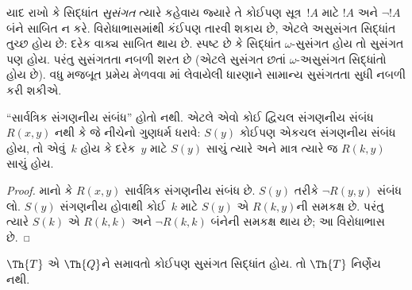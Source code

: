 \documentclass[../../../include/open-logic-section]{subfiles}
\begin{document}


\begin{explain}
યાદ રાખો કે સિદ્ધાંત
\emph{સુસંગત} ત્યારે કહેવાય
જ્યારે તે કોઈપણ
સૂત્ર~$!A$ માટે
$!A$ અને $\lnot !A$
બંને સાબિત ન કરે.
વિરોધાભાસમાંથી કંઈપણ તારવી
શકાય છે, એટલે અસુસંગત
સિદ્ધાંત તુચ્છ હોય છે:
દરેક વાક્ય સાબિત થાય છે.
સ્પષ્ટ છે કે સિદ્ધાંત
$\omega$-સુસંગત હોય તો
સુસંગત પણ હોય. પરંતુ
સુસંગતતા નબળી શરત છે
(એટલે સુસંગત છતાં
$\omega$-અસુસંગત સિદ્ધાંતો
હોય છે). વધુ મજબૂત પ્રમેય
મેળવવા
માં
લેવાયેલી ધારણાને સામાન્ય
સુસંગતતા સુધી નબળી કરી
શકીએ.
\end{explain}

\begin{lem}
``સાર્વત્રિક સંગણનીય સંબંધ''
હોતો નથી. એટલે એવો કોઈ
દ્વિચલ સંગણનીય સંબંધ
$R(x,y)$ નથી કે જે નીચેનો
ગુણધર્મ ધરાવે: $S(y)$
કોઈપણ એકચલ સંગણનીય
સંબંધ હોય, તો એવું~$k$
હોય કે દરેક~$y$ માટે
$S(y)$ સાચું ત્યારે અને
માત્ર ત્યારે જ $R(k,y)$
સાચું હોય.
\end{lem}

\begin{proof}
માનો કે $R(x,y)$ સાર્વત્રિક
સંગણનીય સંબંધ છે.
$S(y)$ તરીકે $\lnot R(y,y)$
સંબંધ લો. $S(y)$ સંગણનીય
હોવાથી કોઈ~$k$ માટે
$S(y)$ એ $R(k,y)$ની
સમકક્ષ છે. પરંતુ ત્યારે
$S(k)$ એ $R(k,k)$ અને
$\lnot R(k,k)$ બંનેની
સમકક્ષ થાય છે; આ
વિરોધાભાસ છે.
\end{proof}


\begin{thm}
$\Th{T}$ એ $\Th{Q}$ને
સમાવતો કોઈપણ સુસંગત
સિદ્ધાંત હોય. તો $\Th{T}$
નિર્ણેય નથી.
\end{thm}
\end{document}
